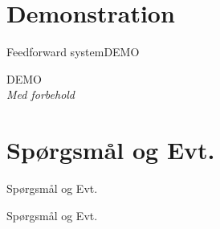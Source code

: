 \documentclass[10pt,aspectratio=169]{beamer}
\begin{document}
\section{Demonstration}
\begin{frame}{Feedforward system}{DEMO}

\begin{center}
DEMO\\
\textit{Med forbehold}
\end{center}
\end{frame}

\section{Spørgsmål og Evt.}
\begin{frame}{Spørgsmål og Evt.}
  \begin{center}
Spørgsmål og Evt.
  \end{center}
\end{frame}





{\aauwavesbg
\begin{frame}
  \finalpage{}
\end{frame}}
\end{document}

